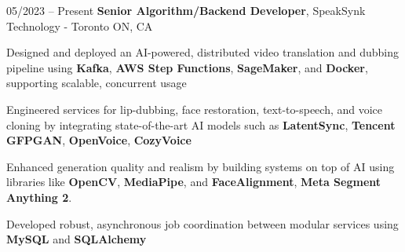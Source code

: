 \begin{twocolentry}{
    05/2023 – Present
}
\fontsize{11 pt}{11 pt}\textbf{Senior Algorithm/Backend Developer}, SpeakSynk Technology - Toronto ON, CA\end{twocolentry}

\vspace{0.10 cm}
\begin{onecolentry}
    \begin{highlights}
        \item Designed and deployed an AI-powered, distributed video translation and dubbing pipeline using \textbf{Kafka}, \newline \textbf{AWS Step Functions}, \textbf{SageMaker}, and \textbf{Docker}, supporting scalable, concurrent usage
        \item Engineered services for lip-dubbing, face restoration, text-to-speech, and voice cloning by integrating state-of-the-art AI models such as \textbf{LatentSync}, \textbf{Tencent GFPGAN}, \textbf{OpenVoice}, \textbf{CozyVoice}
        \item Enhanced generation quality and realism by building systems on top of AI using libraries like \textbf{OpenCV}, \textbf{MediaPipe}, and \textbf{FaceAlignment}, \textbf{Meta Segment Anything 2}.
        \item Developed robust, asynchronous job coordination between modular services using \textbf{MySQL} and \textbf{SQLAlchemy} 
    \end{highlights}
\end{onecolentry}
